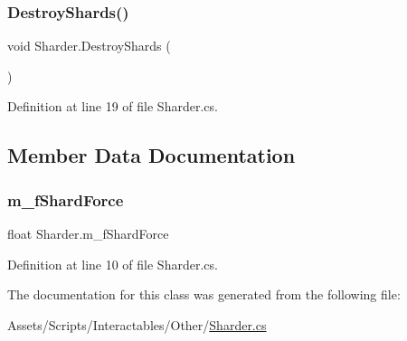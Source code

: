 \subsubsection{\texorpdfstring{Destroy\+Shards()}{DestroyShards()}}
{\footnotesize\ttfamily void Sharder.\+Destroy\+Shards (\begin{DoxyParamCaption}{ }\end{DoxyParamCaption})}



Definition at line 19 of file Sharder.\+cs.



\subsection{Member Data Documentation}
\mbox{\label{class_sharder_a16b103fe97c9f41f5a3ac00a7d2f2f14}} 
\subsubsection{\texorpdfstring{m\+\_\+f\+Shard\+Force}{m\_fShardForce}}
{\footnotesize\ttfamily float Sharder.\+m\+\_\+f\+Shard\+Force}



Definition at line 10 of file Sharder.\+cs.



The documentation for this class was generated from the following file\+:\begin{DoxyCompactItemize}
\item 
Assets/\+Scripts/\+Interactables/\+Other/\mbox{\hyperlink{_sharder_8cs}{Sharder.\+cs}}\end{DoxyCompactItemize}
